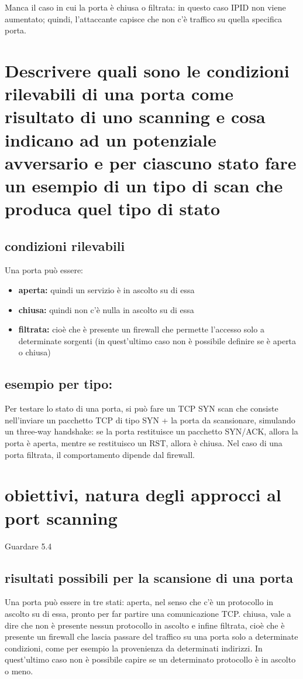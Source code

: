 \documentclass{report}
\begin{document}
\noindent Manca il caso in cui la porta è chiusa o filtrata: in questo caso IPID non viene aumentato; quindi, l'attaccante capisce che non c'è traffico su quella specifica porta.

\section{Descrivere quali sono le condizioni rilevabili di una porta come risultato di uno scanning e cosa indicano ad un potenziale avversario e 
per ciascuno stato fare un esempio di un tipo di scan che produca quel tipo di stato}

\subsection{condizioni rilevabili}
Una porta può essere:
\begin{itemize}
    \item \textbf{aperta:} quindi un servizio è in ascolto su di essa
    \item \textbf{chiusa:} quindi non c'è nulla in ascolto su di essa 
    \item \textbf{filtrata:} cioè che è presente un firewall che permette l'accesso solo a determinate sorgenti (in quest'ultimo caso non è possibile definire se è aperta o chiusa)
\end{itemize} 

\subsection{esempio per tipo:}
Per testare lo stato di una porta, si può fare un TCP SYN scan che consiste nell'inviare un pacchetto TCP di tipo SYN + la porta da scansionare,
simulando un three-way handshake: se la porta restituisce un pacchetto SYN/ACK, 
allora la porta è aperta, mentre se restituisco un RST, allora è chiusa. Nel caso di una porta filtrata, il comportamento dipende dal firewall.


\section{obiettivi, natura degli approcci al port scanning}
Guardare 5.4
\subsection{risultati possibili per la scansione di una porta}
Una porta può essere in tre stati: aperta, nel senso che c'è un protocollo in ascolto su di essa, pronto per far partire una comunicazione TCP.
chiusa, vale a dire che non è presente nessun protocollo in ascolto e infine filtrata, cioè che è presente un firewall che lascia passare del traffico
su una porta solo a determinate condizioni, come per esempio la provenienza da determinati indirizzi.
In quest'ultimo caso non è possibile capire se un determinato protocollo è in ascolto o meno.
\end{document}
